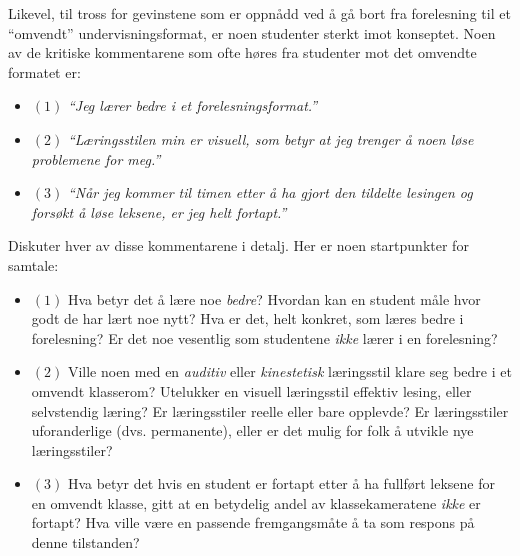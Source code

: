 \vskip 20pt

Likevel, til tross for gevinstene som er oppnådd ved å gå bort fra forelesning til et ``omvendt'' undervisningsformat, er noen studenter sterkt imot konseptet.  Noen av de kritiske kommentarene som ofte høres fra studenter mot det omvendte formatet er:

\begin{itemize}
\item{$(1)$} {\it ``Jeg lærer bedre i et forelesningsformat.''}
\vskip 5pt
\item{$(2)$} {\it ``Læringsstilen min er visuell, som betyr at jeg trenger å  noen løse problemene for meg.''}
\vskip 5pt
\item{$(3)$} {\it ``Når jeg kommer til timen etter å ha gjort den tildelte lesingen og forsøkt å løse leksene, er jeg helt fortapt.''}
\end{itemize}

\vskip 10pt

Diskuter hver av disse kommentarene i detalj.  Her er noen startpunkter for samtale:

\begin{itemize}
\item{$(1)$} Hva betyr det å lære noe {\it bedre}?  Hvordan kan en student måle hvor godt de har lært noe nytt?  Hva er det, helt konkret, som læres bedre i forelesning?  Er det noe vesentlig som studentene {\it ikke} lærer i en forelesning?
\vskip 5pt
\item{$(2)$} Ville noen med en {\it auditiv} eller {\it kinestetisk} læringsstil klare seg bedre i et omvendt klasserom?  Utelukker en visuell læringsstil effektiv lesing, eller selvstendig læring?  Er læringsstiler reelle eller bare opplevde?  Er læringsstiler uforanderlige (dvs. permanente), eller er det mulig for folk å utvikle nye læringsstiler?
\vskip 5pt
\item{$(3)$} Hva betyr det hvis en student er fortapt etter å ha fullført leksene for en omvendt klasse, gitt at en betydelig andel av klassekameratene {\it ikke} er fortapt?  Hva ville være en passende fremgangsmåte å ta som respons på denne tilstanden?
\end{itemize}

\vskip 10pt













